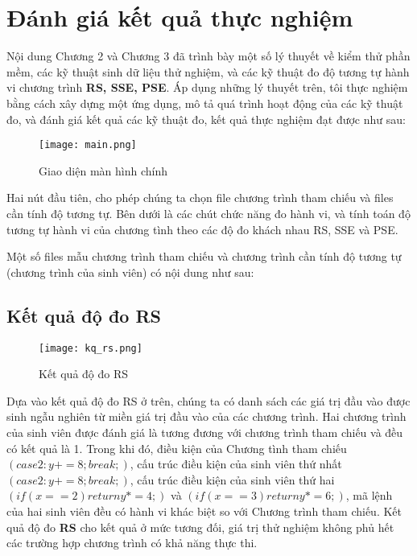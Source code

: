 \section{Đánh giá kết quả thực nghiệm}

Nội dung Chương 2 và Chương 3 đã trình bày một số lý thuyết về kiểm
thử phần mềm, các kỹ thuật sinh dữ liệu thử nghiệm, và các kỹ thuật đo
độ tương tự hành vi chương trình \textbf{RS, SSE, PSE}. Áp dụng những
lý thuyết trên, tôi thực nghiệm bằng cách xây dựng một ứng dụng, mô tả
quá trình hoạt động của các kỹ thuật đo, và đánh giá kết quả các kỹ
thuật đo, kết quả thực nghiệm đạt được như sau:

\begin{center}
  \begin{figure}[h]
    \begin{center}
      \texttt{[image: main.png]}
    \end{center}
    \caption{Giao diện màn hình chính}
  \end{figure}
\end{center}

Hai nút đầu tiên, cho phép chúng ta chọn file chương trình tham chiếu và files cần tính độ tương tự. Bên dưới là các chút chức năng đo hành vi, và tính toán độ tương tự hành vi của chương tình theo các độ đo khách nhau RS, SSE và PSE.

Một số files mẫu chương trình tham chiếu và chương trình cần tính độ tương tự (chương trình của sinh viên) có nội dung như sau:





\subsection{Kết quả độ đo RS}
\begin{center}
  \begin{figure}[h]
    \begin{center}
      \texttt{[image: kq\_rs.png]}
    \end{center}
    \caption{Kết quả độ đo RS}
  \end{figure}
\end{center}

Dựa vào kết quả độ đo RS ở trên, chúng ta có danh sách các giá trị đầu
vào được sinh ngẫu nghiên từ miền giá trị đầu vào của các chương
trình. Hai chương trình của sinh viên được đánh giá là tương đương với
chương trình tham chiếu và đều có kết quả là 1. Trong khi đó, điều
kiện của Chương tình tham chiếu $(case 2: y += 8; break;)$, cấu trúc
điều kiện của sinh viên thứ nhất $(case 2: y += 8; break;)$, cấu trúc
điều kiện của sinh viên thứ hai $(if (x == 2) return y *= 4;)$ và
$(if (x == 3) return y *= 6;)$, mã lệnh của hai sinh viên đều có hành
vi khác biệt so với Chương trình tham chiếu. Kết quả độ đo \textbf{RS}
cho kết quả ở mức tương đối, giá trị thử nghiệm không phủ hết các
trường hợp chương trình có khả năng thực thi.

